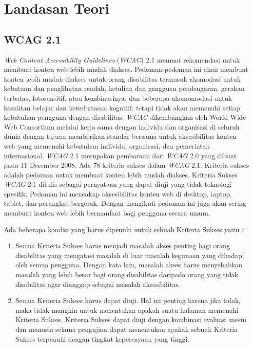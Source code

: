 \chapter{Landasan Teori}
\label{chap:teori}


\section{WCAG 2.1}
\label{sec:WCAG2.1} 
\textit{Web Content Accessibility Guidelines} (\textit{WCAG}) 2.1 memuat rekomendasi untuk membuat konten web lebih mudah diakses. Pedoman-pedoman ini akan membuat konten lebih mudah diakses untuk orang disabilitas termasuk akomodasi untuk kebutaan dan penglihatan rendah, ketulian dan gangguan pendengaran, gerakan terbatas, fotosensitif, atau kombinasinya, dan beberapa akomomodasi untuk kesulitan belajar dan keterbatasan kognitif; tetapi tidak akan memenuhi setiap kebutuhan pengguna dengan disabilitas. \textit{WCAG} dikembangkan oleh World Wide Web Consortium melalui kerja sama dengan individu dan organisasi di seluruh dunia dengan tujuan memberikan standar bersama untuk aksesibilitas konten web yang memenuhi kebutuhan individu, organisasi, dan pemerintah internasional. \textit{WCAG} 2.1 merupakan pembaruan dari \textit{WCAG} 2.0 yang dibuat pada 11 Desember 2008. Ada 78 kriteria sukses dalam \textit{WCAG} 2.1. Kriteria sukses adalah pedoman untuk membuat konten lebih mudah diakses. Kriteria Sukses \textit{WCAG} 2.1 ditulis sebagai pernyataan yang dapat diuji yang tidak teknologi spesifik. Pedoman ini mencakup aksesibilitas konten web di desktop, laptop, tablet, dan perangkat bergerak. Dengan mengikuti pedoman ini juga akan sering membuat konten web lebih bermanfaat bagi pengguna secara umum.

Ada beberapa kondisi yang harus dipenuhi untuk sebuah Kriteria Sukses yaitu :

\begin{enumerate}
	\item Semua Kriteria Sukses harus menjadi masalah akses penting bagi orang disabilitas yang mengatasi masalah di luar masalah kegunaan yang dihadapi oleh semua pengguna. Dengan kata lain, masalah akses harus menyebabkan masalah yang lebih besar bagi orang disabilitas daripada orang yang tidak disabilitas agar dianggap sebagai masalah aksesibilitas.
	\item Semua Kriteria Sukses harus dapat diuji. Hal ini penting karena jika tidak, maka tidak mungkin untuk menentukan apakah suatu halaman memenuhi Kriteria Sukses. Kriteria Sukses dapat diuji dengan kombinasi evaluasi mesin dan manusia selama pengujian dapat menentukan apakah sebuah Kriteria Sukses terpenuhi dengan tingkat kepercayaan yang tinggi.
\end{enumerate}


